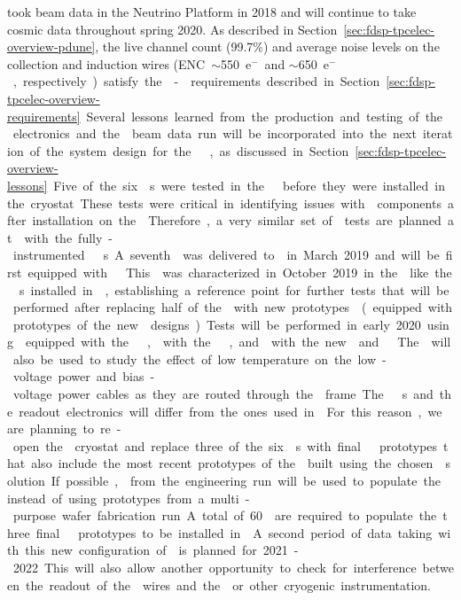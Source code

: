  took beam data in the  Neutrino Platform in 2018 and will continue
to take cosmic data throughout spring 2020. As described in Section~\ref{sec:fdsp-tpcelec-overview-pdune},
the live channel count (99.7\%) and average noise levels on the collection and induction wires 
(ENC~$\sim$\SI{550}{e$^-$} and $\sim$\SI{650}{e$^-$}, respectively) satisfy the - requirements described 
in Section~\ref{sec:fdsp-tpcelec-overview-requirements}. Several lessons learned from the production 
and testing of the  electronics and the  beam data run will be incorporated into the 
next iteration of the system design for the  , as discussed in 
Section~\ref{sec:fdsp-tpcelec-overview-lessons}.

Five of the six s were tested in the  \coldbox
before they were installed in the cryostat. These tests were critical
in identifying issues with  components after installation
on the . Therefore, a very similar set of \coldbox tests are planned at  
with the fully-instrumented  s. A seventh  was delivered
to  in March 2019 and will be first equipped with  . This
 was characterized in October 2019 in the \coldbox like the s installed
in , establishing a reference point for further tests that will be
performed after replacing half of the  with new prototypes  (equipped with prototypes of the
new  designs). Tests will be performed in 
early 2020 using  equipped with the  , 
with the  , and  with the new  and
 . The \coldbox will also be used to study the effect of
low temperature on the low-voltage power and bias-voltage power cables as they are 
routed through the  frame.

The  s and the readout electronics will differ from the ones used 
in . For this reason, we are planning to re-open the  cryostat 
and replace three of the six s with final   prototypes that also include 
the most recent prototypes of the  built using the chosen  solution.
If possible,  from the engineering 
run will be used to populate the  instead of using prototypes from a multi-purpose
wafer fabrication run. A total of \num{60}  are required to populate the three 
final   prototypes to be installed in . A second period of data taking 
with this new configuration of  is planned for 2021-2022. This will also 
allow another opportunity to check for interference between the readout of the  
wires and the  or other cryogenic instrumentation. 

